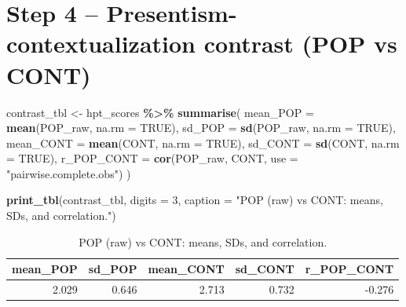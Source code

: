 \documentclass[
  10pt,
]{article}
\newenvironment{Shaded}{\begin{snugshade}}{\end{snugshade}}
\newcommand{\AttributeTok}[1]{\textcolor[rgb]{0.13,0.29,0.53}{#1}}
\newcommand{\ConstantTok}[1]{\textcolor[rgb]{0.56,0.35,0.01}{#1}}
\newcommand{\DecValTok}[1]{\textcolor[rgb]{0.00,0.00,0.81}{#1}}
\newcommand{\FunctionTok}[1]{\textcolor[rgb]{0.13,0.29,0.53}{\textbf{#1}}}
\newcommand{\NormalTok}[1]{#1}
\newcommand{\OtherTok}[1]{\textcolor[rgb]{0.56,0.35,0.01}{#1}}
\newcommand{\SpecialCharTok}[1]{\textcolor[rgb]{0.81,0.36,0.00}{\textbf{#1}}}
\newcommand{\StringTok}[1]{\textcolor[rgb]{0.31,0.60,0.02}{#1}}
\begin{document}
\hypertarget{step-4-presentism-contextualization-contrast-pop-vs-cont}{%
\section{Step 4 -- Presentism-contextualization contrast (POP vs
CONT)}\label{step-4-presentism-contextualization-contrast-pop-vs-cont}}

\begin{Shaded}
\begin{Highlighting}[]
\NormalTok{contrast\_tbl }\OtherTok{\textless{}{-}}\NormalTok{ hpt\_scores }\SpecialCharTok{\%\textgreater{}\%}
  \FunctionTok{summarise}\NormalTok{(}
    \AttributeTok{mean\_POP   =} \FunctionTok{mean}\NormalTok{(POP\_raw,  }\AttributeTok{na.rm =} \ConstantTok{TRUE}\NormalTok{),  }\AttributeTok{sd\_POP   =} \FunctionTok{sd}\NormalTok{(POP\_raw,  }\AttributeTok{na.rm =} \ConstantTok{TRUE}\NormalTok{),}
    \AttributeTok{mean\_CONT  =} \FunctionTok{mean}\NormalTok{(CONT,     }\AttributeTok{na.rm =} \ConstantTok{TRUE}\NormalTok{),  }\AttributeTok{sd\_CONT  =} \FunctionTok{sd}\NormalTok{(CONT,     }\AttributeTok{na.rm =} \ConstantTok{TRUE}\NormalTok{),}
    \AttributeTok{r\_POP\_CONT =} \FunctionTok{cor}\NormalTok{(POP\_raw, CONT, }\AttributeTok{use =} \StringTok{"pairwise.complete.obs"}\NormalTok{)}
\NormalTok{  )}

\FunctionTok{print\_tbl}\NormalTok{(contrast\_tbl, }\AttributeTok{digits =} \DecValTok{3}\NormalTok{, }\AttributeTok{caption =} \StringTok{"POP (raw) vs CONT: means, SDs, and correlation."}\NormalTok{)}
\end{Highlighting}
\end{Shaded}

\begin{longtable}[t]{rrrrr}
\caption{\label{tab:pop-cont-contrast}POP (raw) vs CONT: means, SDs, and correlation.}\\
\toprule
mean\_POP & sd\_POP & mean\_CONT & sd\_CONT & r\_POP\_CONT\\
\midrule
2.029 & 0.646 & 2.713 & 0.732 & -0.276\\
\bottomrule
\end{longtable}

\begin{Shaded}
\end{Shaded}
\end{document}
